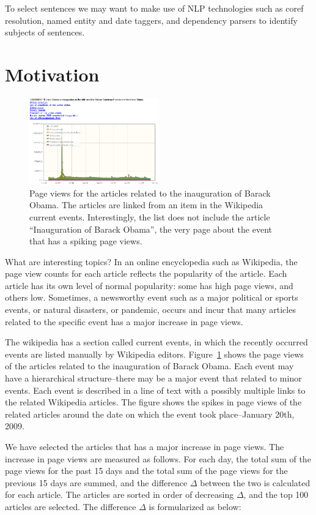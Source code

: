 \documentclass[11pt]{article}
\begin{document}
To select sentences we may want to make use of NLP technologies such as coref resolution, named entity and date taggers, and dependency parsers to identify subjects of sentences.

\section{Motivation}

\begin{figure}
\centering
\includegraphics[width=0.5\textwidth]{figures/obama_sparkline.png}
\caption{Page views for the articles related to the inauguration of Barack Obama. The articles are linked from an item in the Wikipedia current events. Interestingly, the list does not include the article ``Inauguration of Barack Obama'', the very page about the event that has a spiking page views.}
\label{fig:obama-sparkline}
\end{figure}

What are interesting topics? In an online encyclopedia such as Wikipedia, the page view counts for each article reflects the popularity of the article. Each article has its own level of normal popularity: some has high page views, and others low. Sometimes, a newsworthy event such as a major political or sports events, or natural disasters, or pandemic, occurs and incur that many articles related to the specific event has a major increase in page views.

The wikipedia has a section called current events, in which the recently occurred events are listed manually by Wikipedia editors. Figure~\ref{fig:obama-sparkline} shows the page views of the articles related to the inauguration of Barack Obama. Each event may have a hierarchical structure--there may be a major event that related to minor events. Each event is described in a line of text with a possibly multiple links to the related Wikipedia articles. The figure shows the spikes in page views of the related articles around the date on which the event took place--January 20th, 2009.

We have selected the articles that has a major increase in page views. The increase in page views are measured as follows. For each day, the total sum of the page views for the past 15 days and the total sum of the page views for the previous 15 days are summed, and the difference $\Delta$ between the two is calculated for each article. The articles are sorted in order of decreasing $\Delta$, and the top 100 articles are selected. The difference $\Delta$ is formularized as below:
\end{document}
